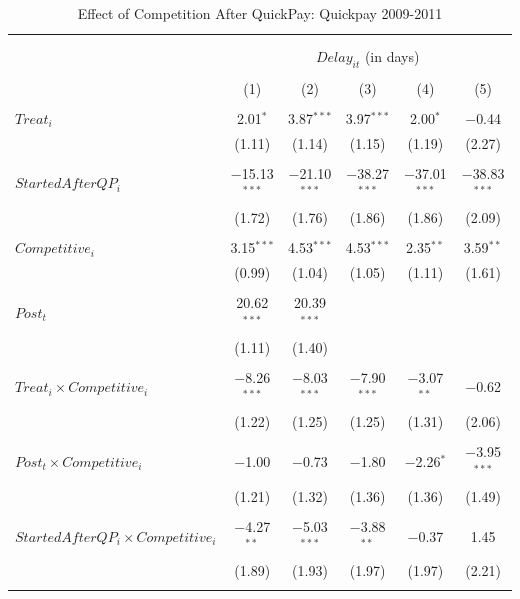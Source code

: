 \documentclass[
]{article}
\begin{document}
\begin{table}[H] \centering 
  \caption{Effect of Competition After QuickPay: Quickpay 2009-2011} 
  \label{} 
\small 
\begin{tabular}{@{\extracolsep{-2pt}}lccccc} 
\\[-1.8ex]\hline 
\hline \\[-1.8ex] 
\\[-1.8ex] & \multicolumn{5}{c}{$Delay_{it}$ (in days)} \\ 
\\[-1.8ex] & (1) & (2) & (3) & (4) & (5)\\ 
\hline \\[-1.8ex] 
 $Treat_i$ & 2.01$^{*}$ & 3.87$^{***}$ & 3.97$^{***}$ & 2.00$^{*}$ & $-$0.44 \\ 
  & (1.11) & (1.14) & (1.15) & (1.19) & (2.27) \\ 
  & & & & & \\ 
 $StartedAfterQP_i$ & $-$15.13$^{***}$ & $-$21.10$^{***}$ & $-$38.27$^{***}$ & $-$37.01$^{***}$ & $-$38.83$^{***}$ \\ 
  & (1.72) & (1.76) & (1.86) & (1.86) & (2.09) \\ 
  & & & & & \\ 
 $Competitive_i$ & 3.15$^{***}$ & 4.53$^{***}$ & 4.53$^{***}$ & 2.35$^{**}$ & 3.59$^{**}$ \\ 
  & (0.99) & (1.04) & (1.05) & (1.11) & (1.61) \\ 
  & & & & & \\ 
 $Post_t$ & 20.62$^{***}$ & 20.39$^{***}$ &  &  &  \\ 
  & (1.11) & (1.40) &  &  &  \\ 
  & & & & & \\ 
 $Treat_i \times Competitive_i$ & $-$8.26$^{***}$ & $-$8.03$^{***}$ & $-$7.90$^{***}$ & $-$3.07$^{**}$ & $-$0.62 \\ 
  & (1.22) & (1.25) & (1.25) & (1.31) & (2.06) \\ 
  & & & & & \\ 
 $Post_t \times Competitive_i$ & $-$1.00 & $-$0.73 & $-$1.80 & $-$2.26$^{*}$ & $-$3.95$^{***}$ \\ 
  & (1.21) & (1.32) & (1.36) & (1.36) & (1.49) \\ 
  & & & & & \\ 
 $StartedAfterQP_i \times Competitive_i$ & $-$4.27$^{**}$ & $-$5.03$^{***}$ & $-$3.88$^{**}$ & $-$0.37 & 1.45 \\ 
  & (1.89) & (1.93) & (1.97) & (1.97) & (2.21) \\ 
  & & & & & \\ 

\end{tabular}
\end{table}
\end{document}
